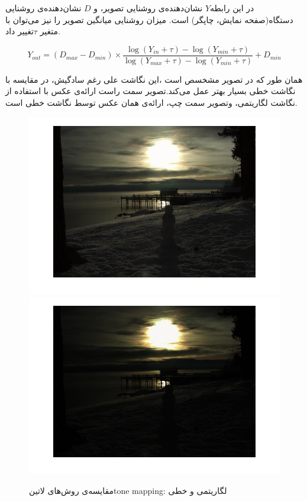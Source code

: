 در این رابطه$Y$  نشان‌دهنده‌ی روشنایی تصویر، و $D$  نشان‌دهنده‌ی روشنایی دستگاه(صفحه نمایش، چاپگر) است.
میزان روشنایی میانگین تصویر را نیز می‌توان با متغیر $\tau $تغییر داد.

\begin{equation}
Y_{out}  = (D_{max} - D_{min}) \times
 \frac{\log( Y_{in} + \tau) - \log(Y_{min} + \tau)}{\log( Y_{max} + \tau) - \log(Y_{min} + \tau)} 
+ D_{min}
\end{equation}

همان طور که در تصویر مشخسص است ،این نگاشت علی رغم سادگیش، در مقایسه با نگاشت خطی بسیار بهتر عمل  می‌کند.تصویر سمت راست ارائه‌ی عکس با استفاده از نگاشت لگاریتمی، وتصویر سمت چپ، ارائه‌ی همان عکس توسط نگاشت خطی است.
\begin{figure}[!htb]
	\includegraphics[width=\linewidth]{images/logtonemap}
	\endminipage\hfill
	\includegraphics[width=\linewidth]{images/lineartonemap}
	\endminipage\hfill

	\caption{مقایسه‌ی روش‌های
		‌لاتین{tone mapping}: لگاریتمی و خطی
		}\label{fig:linear_vs_log}

\end{figure}


